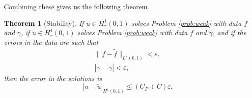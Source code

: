 \documentclass{article}
\theoremstyle{plain}
\newtheorem{theorem}{Theorem}
\theoremstyle{definition}
\begin{document}
Combining these gives us the following theorem.
\begin{theorem}[Stability]
  If $u \in H^1_r(0,1)$ solves Problem \ref{prob:weak} with data $f$ and $\gamma$, if $\widetilde u \in H^1_r(0,1)$ solves Problem \ref{prob:weak} with data $\widetilde f$ and $\widetilde \gamma$, and if the errors in the data are such that
  \begin{align}
    \|f-\widetilde f\|_{L^2(0,1)} < \varepsilon, \\
    |\gamma - \widetilde \gamma| < \varepsilon,
  \end{align}
  then the error in the solutions is
  \begin{equation}
    |u-\widetilde u|_{H^1(0,1)} \leq (C_P + C)\varepsilon.
  \end{equation}
\end{theorem}
\end{document}
